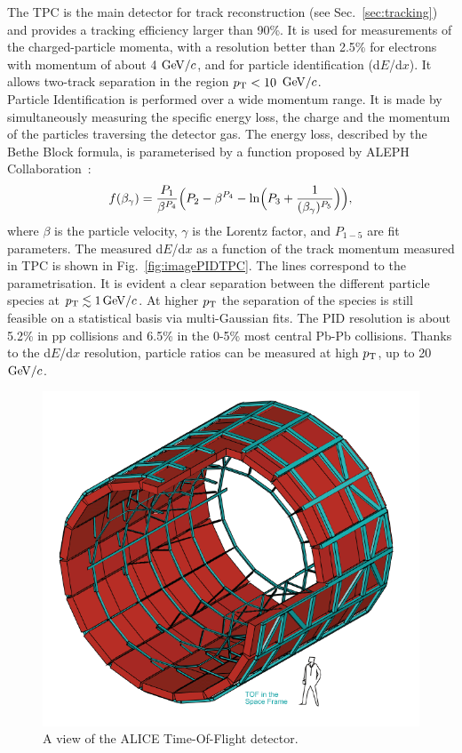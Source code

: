 The TPC is the main detector for track reconstruction (see Sec.~\ref{sec:tracking}) and provides a 
tracking efficiency larger than 90\%. It is used for measurements of the charged-particle 
momenta, with a resolution better than 2.5\% for electrons with momentum 
of about 4 $\mathrm{GeV}/c$, and for particle identification (d$E$/d$x$). It allows
two-track separation in the region $p_{\rm T} <10$ $\mathrm{GeV}/c$.\\


Particle Identification is performed over a wide momentum range. It is made by 
simultaneously measuring the specific energy loss, the charge and the momentum of the 
particles traversing the detector gas. The energy loss, described by the Bethe Block formula,
is parameterised by a function proposed by ALEPH Collaboration~\cite{Rolandi:2008qla}:
\begin{equation}
f(\beta_\gamma) = \frac{P_1}{\beta^{P_4}} \Big ( P_2 - \beta^{P_4} - {\rm ln}\Big (   P_3 + \frac{1}{(\beta_\gamma)^{P_5}} \Big )   \Big ),
\end{equation}
where $\beta$ is the particle velocity, $\gamma$ is the Lorentz factor, and $P_{1-5}$ are fit parameters. 
The measured d$E$/d$x$ as a function of the track momentum measured in TPC is
shown in Fig.~\ref{fig:imagePIDTPC}. The lines correspond to the parametrisation. 
It is evident a clear separation between the different particle species
at $p_{\rm T} \lesssim 1 \, \mathrm{GeV}/c$. At higher $p_{\rm T}$ the separation of the species is still feasible 
on a statistical basis via multi-Gaussian fits. The PID resolution is about 5.2\% in 
pp collisions and 6.5\% in the 0-5\% most central Pb-Pb collisions. Thanks to the d$E$/d$x$ resolution, 
particle ratios can be measured at high $p_{\rm T}$, up to 20 $\mathrm{GeV}/c$.
 \begin{figure}[!h]
\centering
\includegraphics[width=.6\textwidth]{FigCap3/TOFCylinder.png}
\caption{A view of the ALICE Time-Of-Flight detector.}
\label{fig:imageTOF}
\end{figure}
